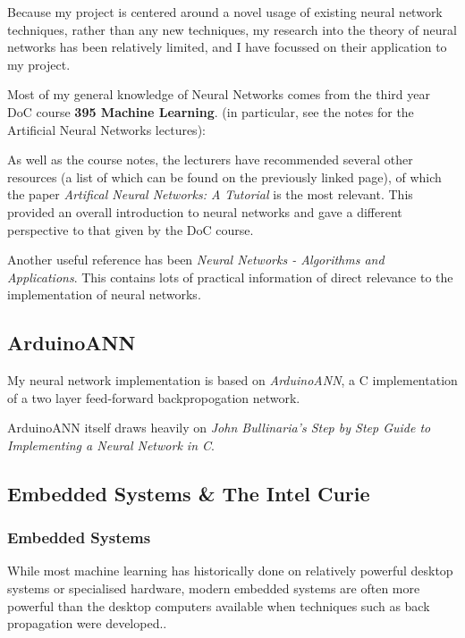 \documentclass[a4paper]{article}
\begin{document}
Because my project is centered around a novel usage of existing neural network techniques, rather than any new techniques, my research into the theory of neural networks has been relatively limited, and I have focussed on their application to my project.

Most of my general knowledge of Neural Networks comes from the third year DoC course \textbf{395 Machine Learning}\cite{bgref0}. (in particular, see the notes for the Artificial Neural Networks lectures):

As well as the course notes, the lecturers have recommended several other resources (a list of which can be found on the previously linked page), of which the paper \textit{Artifical Neural Networks: A Tutorial}\cite{bgref1} is the most relevant. This provided an overall introduction to neural networks and gave a different perspective to that given by the DoC course.

Another useful reference has been \textit{Neural Networks - Algorithms and Applications}\cite{bgref2}. This contains lots of practical information of direct relevance to the implementation of neural networks.

\subsection{ArduinoANN}%

My neural network implementation is based on \textit{ArduinoANN}\cite{bgref3}, a C implementation of a two layer feed-forward backpropogation network. 

ArduinoANN itself draws heavily on \textit{John Bullinaria's Step by Step Guide to Implementing a Neural Network in C}\cite{bgref4}.

\subsection{Embedded Systems \& The Intel Curie}%

\subsubsection{Embedded Systems}

While most machine learning has historically done on relatively powerful desktop systems or specialised hardware, modern embedded systems are often more powerful than the desktop computers available when techniques such as back propagation were developed.\cite{bgref5}. 
\end{document}
